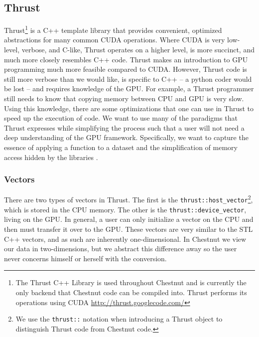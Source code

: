 \documentclass[twocolumn]{article}
\renewcommand{\|}{\origbar} %
\newcommand{\code}[1]{\texttt{#1}}
\begin{document}
\subsection{Thrust}

Thrust\footnote{The Thrust C++ Library is used throughout Chestnut and is currently the only backend that Chestnut code can be compiled into. Thrust performs its operations using CUDA \url{http://thrust.googlecode.com/}} is a C++ template library that provides convenient, optimized abstractions for many common CUDA operations. Where CUDA is very low-level, verbose, and C-like, Thrust operates on a higher level, is more succinct, and much more closely resembles C++ code. Thrust makes an introduction to GPU programming much more feasible compared to CUDA. However, Thrust code is still more verbose than we would like, is specific to C++ -- a python coder would be lost -- and requires knowledge of the GPU. For example, a Thrust programmer still needs to know that copying memory between CPU and GPU is very slow. Using this knowledge, there are some optimizations that one can use in Thrust to speed up the execution of code. We want to use many of the paradigms that Thrust expresses while simplifying the process such that a user will not need a deep understanding of the GPU framework. Specifically, we want to capture the essence of applying a function to a dataset and the simplification of memory access hidden by the libraries \cite{hoberock}.

\subsubsection{Vectors}
\label{sec:thrustVectors}

There are two types of vectors in Thrust. The first is the \code{thrust::host\_vector}\footnote{We use the \code{thrust::} notation when introducing a Thrust object to distinguish Thrust code from Chestnut code.}, which is stored in the CPU memory. The other is the \code{thrust::device\_vector}, living on the GPU. In general, a user can only initialize a vector on the CPU and then must transfer it over to the GPU. These vectors are very similar to the STL C++ vectors, and as such are inherently one-dimensional. In Chestnut we view our data in two-dimensions, but we abstract this difference away so the user never concerns himself or herself with the conversion. 
\end{document}
